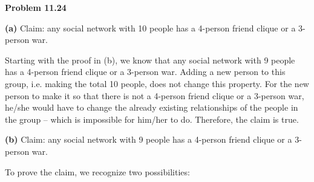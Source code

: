 \documentclass[fleqn]{article}
\begin{document}
\newpage
{\Large\bf Problem 11.24}\vspace{1em}\par
\textbf{(a)} Claim: any social network with 10 people has a 4-person friend clique or a 3-person war.\par
Starting with the proof in (b), we know that any social network with 9 people has a 4-person friend clique or a 3-person war. Adding a new person to this group, i.e. making the total 10 people, does not change this property. For the new person to make it so that there is not a 4-person friend clique or a 3-person war, he/she would have to change the already existing relationships of the people in the group -- which is impossible for him/her to do. Therefore, the claim is true.\vspace{1em}\par
\textbf{(b)} Claim: any social network with 9 people has a 4-person friend clique or a 3-person war.\par
To prove the claim, we recognize two possibilities:
\end{document}
